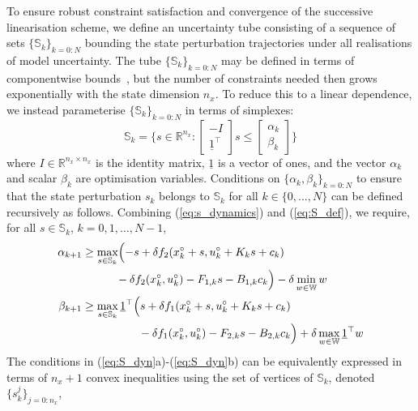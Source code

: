 \documentclass[final,5p,times,twocolumn,authoryear]{elsarticle}
\def\S{\mathbb{S}}
\def\W{\mathbb{W}}
\begin{document}
To ensure robust constraint satisfaction and convergence of the successive linearisation scheme, we define an uncertainty tube consisting of a sequence of sets $\{\S_k\}_{k=0:N}$ bounding the state perturbation trajectories under all realisations of model uncertainty. The tube $\{\S_k\}_{k=0:N}$ may be defined in terms of componentwise bounds~\citep[e.g.][]{doff-sotta22}, but the number of constraints needed then grows exponentially with the state dimension $n_x$. To reduce this to a linear dependence, we instead parameterise $\{\S_k\}_{k=0:N}$ in terms of simplexes:
\begin{equation}\label{eq:S_def}
\S_k = \biggl\{ s \in \mathbb{R}^{n_x} :
\begin{bmatrix} {-I} \\ \underline{1}^\top \end{bmatrix} s \leq \begin{bmatrix} \alpha_k \\ \beta_k\end{bmatrix}\biggr\}
\end{equation}
where $I\in\mathbb{R}^{n_x\times n_x}$ is the identity matrix, $\underline{1}$ is a vector of ones, and the vector
$\alpha_k$ and scalar $\beta_k$ are optimisation variables.
%
Conditions on $\{\alpha_k,\beta_k\}_{k=0:N}$ to ensure that
the state perturbation $s_k$ belongs to $\S_k$ for all $k\in \{0,\ldots,N\}$ can be defined recursively as follows. Combining (\ref{eq:s_dynamics}) and (\ref{eq:S_def}), we require, for all $s\in \S_k$, $k=0,1,\ldots,N-1$,
\begin{subequations}\label{eq:S_dyn}%
\begin{align}
\alpha_{k+1} &\geq \max_{s\in\S_k} \Bigl( {-s}
    +\delta f_2 (x_k^\circ+s , u_k^\circ + K_k s + c_k )
    \\
    & \qquad\quad - \delta f_2 (x_k^\circ , u_k^\circ ) - F_{1,k} s - B_{1,k} c_k\Bigr)
    - \delta\min_{w\in\W} w
\nonumber \\
\beta_{k+1} &\geq \max_{s\in\S_k} \underline{1}^\top \Bigl( s + \delta f_1 (x_k^\circ + s , u_k^\circ + K_k s + c_k)
    \\
    & \qquad\qquad\quad - \delta f_1 (x_k^\circ,  u_k^\circ ) - F_{2,k} s - B_{2,k} c_k\Bigr) + \delta\max_{w\in \W} \underline{1}^\top w 
\nonumber 
\end{align}
\end{subequations}%
%
The conditions in (\ref{eq:S_dyn}a)-(\ref{eq:S_dyn}b) can be equivalently expressed in terms of $n_x+1$ convex inequalities using the set of vertices of $\S_k$, denoted $\{s_k^j\}_{j=0:n_x}$, 
\end{document}
